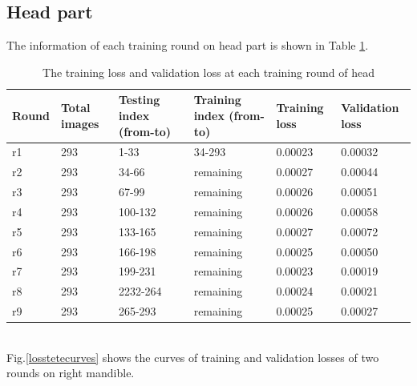 \documentclass[12pt,a4paper]{article}
\begin{document}
\subsection{Head part}
The information of each training round on head part is shown in Table \ref{headloss}.
\begin{table}[h!]
	\centering
	\begin{tabular}{l p{2cm} p{2.4cm} p{2.6cm} p{2.2cm} p{2.2cm}}
	Round & Total images & Testing index (from-to) & Training index (from-to) & Training loss & Validation loss \\ \hline
	r1 & 293 & 1-33 & 34-293 & 0.00023 & 0.00032 \\ \hline
	r2 & 293 & 34-66 & remaining & 0.00027 & 0.00044 \\ \hline
	r3 & 293 & 67-99 & remaining & 0.00026 & 0.00051 \\ \hline
	r4 & 293 & 100-132 & remaining & 0.00026 & 0.00058 \\ \hline
	r5 & 293 & 133-165 & remaining & 0.00027 & 0.00072 \\ \hline
	r6 & 293 & 166-198 & remaining & 0.00025 & 0.00050 \\ \hline
	r7 & 293 & 199-231 & remaining & 0.00023 & 0.00019 \\ \hline
	r8 & 293 & 2232-264 & remaining & 0.00024 & 0.00021 \\ \hline
	r9 & 293 & 265-293 & remaining & 0.00025 & 0.00027 \\ \hline	
	\end{tabular}
	\caption{The training loss and validation loss at each training round of head}
	\label{headloss}
\end{table}~\\
Fig.\ref{losstetecurves} shows the curves of training and validation losses of two rounds on right mandible.
\end{document}
